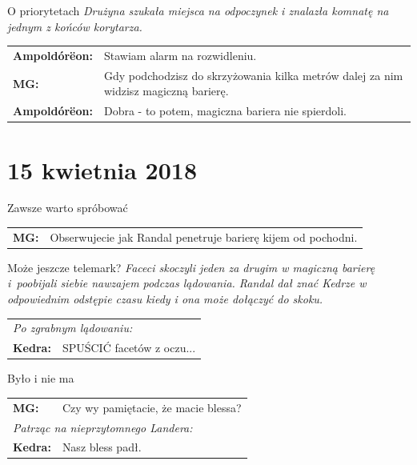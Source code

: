 \documentclass[10pt,twoside,twocolumn]{book}
\begin{document}
\begin{rpg-quotebox}{O priorytetach}
   \textit{Drużyna szukała miejsca na odpoczynek i znalazła komnatę na jednym z końców korytarza.}\\

   \begin{tabularx}{\columnwidth}{lX}
      \textbf{Ampoldórëon:} & Stawiam alarm na rozwidleniu.\\
      \textbf{MG:} & Gdy podchodzisz do skrzyżowania kilka metrów dalej za nim widzisz magiczną barierę.\\
      \textbf{Ampoldórëon:} & Dobra - to potem, magiczna bariera nie spierdoli.\\
   \end{tabularx}
\end{rpg-quotebox}


\section*{15 kwietnia 2018}


\begin{rpg-quotebox}{Zawsze warto spróbować}
   \begin{tabularx}{\columnwidth}{lX}
      \textbf{MG:} & Obserwujecie jak Randal penetruje barierę kijem od pochodni.\\
   \end{tabularx}
\end{rpg-quotebox}


\begin{rpg-quotebox}{Może jeszcze telemark?}
\textit{Faceci skoczyli jeden za drugim w magiczną barierę i~poobijali siebie nawzajem podczas lądowania. Randal dał znać Kedrze w odpowiednim odstępie czasu kiedy i ona może dołączyć do skoku.}\\

   \begin{tabularx}{\columnwidth}{lX}
      \multicolumn{2}{l}{\textit{Po zgrabnym lądowaniu:}}\\
      \textbf{Kedra:} & SPUŚCIĆ facetów z oczu...\\
   \end{tabularx}
\end{rpg-quotebox}


\begin{rpg-quotebox}{Było i nie ma}
   \begin{tabularx}{\columnwidth}{lX}
      \textbf{MG:} & Czy wy pamiętacie, że macie blessa?\\
      \multicolumn{2}{l}{\textit{Patrząc na nieprzytomnego Landera:}}\\
      \textbf{Kedra:} & Nasz bless padł.\\
   \end{tabularx}
\end{rpg-quotebox}
\end{document}

